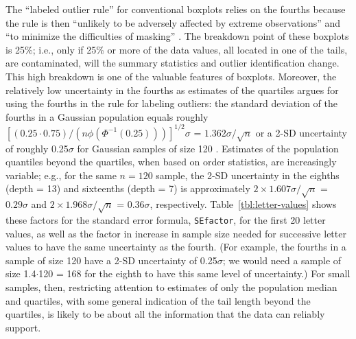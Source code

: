 \documentclass[12pt,oneside]{article}
\begin{document}
The ``labeled outlier rule'' for conventional boxplots relies on the fourths because the rule is then ``unlikely to be adversely affected by extreme observations'' and ``to minimize the difficulties of masking'' \citep[pg. 992]{dchbox}. The breakdown point of these boxplots is 25\%; i.e., only if 25\% or more of the data values, all located in one of the tails, are contaminated, will the summary statistics and outlier identification change. This high breakdown is one of the valuable features of boxplots. Moreover, the relatively low uncertainty in the fourths as estimates of the quartiles argues for using the fourths in the rule for labeling outliers: the standard deviation of the fourths in a Gaussian population equals roughly $[(0.25 \cdot 0.75) / (n \phi(\Phi^{-1}(0.25)))]^{1/2} \sigma$ = $1.362 \sigma / \sqrt{n}$ or a 2-SD uncertainty of roughly 0.25$\sigma$ for Gaussian samples of size 120 \citep{ha.order}. Estimates of the population quantiles beyond the quartiles, when based on order statistics, are increasingly variable; e.g., for the same $n = 120$ sample, the 2-SD uncertainty in the eighths (depth = 13) and sixteenths (depth = 7) is approximately $ 2 \times 1.607 \sigma / \sqrt{n}$ = $0.29 \sigma$ and $ 2 \times 1.968 \sigma / \sqrt{n}$ = $0.36 \sigma$, respectively. Table~\ref{tbl:letter-values} shows these factors for the standard error formula, \texttt{SEfactor}, for the first 20 letter values, as well as the factor in increase in sample size needed for successive letter values to have the same uncertainty as the fourth. (For example, the fourths in a sample of size 120 have a 2-SD uncertainty of 0.25$\sigma$; we would need a sample of size 1.4$\cdot$120 = 168 for the eighth to have this same level of uncertainty.) For small samples, then, restricting attention to estimates of only the population median and quartiles, with some general indication of the tail length beyond the quartiles, is likely to be about all the information that the data can reliably support.
\end{document}
